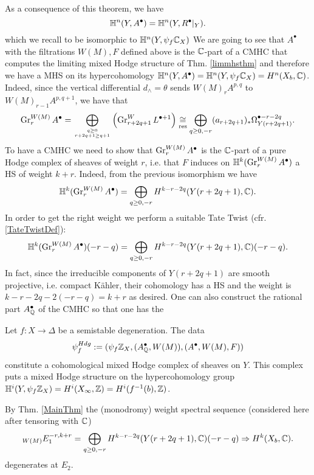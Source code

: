 \documentclass[../main.tex]{subfiles}
\begin{document}
As a consequence of this theorem, we have
\[
\mathbb{H}^n(Y,A^\bullet)= \mathbb{H}^n(Y,R^\bullet|_Y).
\]
which we recall to be isomorphic to $\mathbb{H}^n(Y,\psi_f \mathbb{C}_X)$
We are going to see that $A^\bullet$ with the filtrations $W(M), F$ defined above is the $\mathbb{C}$-part of a CMHC that computes the limiting mixed Hodge structure of Thm. \ref{limmhsthm} and therefore we have a MHS on its hypercohomology $\mathbb{H}^n(Y,A^\bullet)= \mathbb{H}^n(Y,\psi_f \mathbb{C}_X)= H^n(X_b, \mathbb{C})$.
Indeed, since the vertical differential $d_\wedge=\theta$ sends $W(M)_rA^{p,q}$ to $W(M)_{r-1}A^{p,q+1}$, we have that
\[
\operatorname{Gr}^{W(M)}_r A^\bullet = \bigoplus_{q \geq 0 \atop r+2q+1 \geq q+1} \left( \operatorname{Gr}^W_{r+2q+1} L^{\bullet+1} \right) \underset{{\operatorname{res}}} {\cong}   \bigoplus_{q \geq0,-r}(a_{r+2q+1})_* \Omega^{\bullet-r-2q}_{Y(r+2q+1)}.
\]
To have a CMHC we need to show that $\operatorname{Gr}^{W(M)}_r A^\bullet$ is the $\mathbb{C}$-part of a pure Hodge complex of sheaves of weight $r$, i.e. that $F$  induces on  $\mathbb{H}^k(\operatorname{Gr}^{W(M)}_r A^\bullet)$ a HS of weight $k+r$. Indeed, from the previous isomorphism we have
\[
\mathbb{H}^k(\operatorname{Gr}^{W(M)}_r A^\bullet)  = \bigoplus_{q \geq0,-r}H^{k-r-2q}(Y(r+2q+1), \mathbb{C}).
\]
In order to get the right weight we perform a suitable Tate Twist (cfr. \ref{TateTwistDef}):
\[
\mathbb{H}^k(\operatorname{Gr}^{W(M)}_r A^\bullet) (-r-q) = \bigoplus_{q \geq0,-r}H^{k-r-2q}(Y(r+2q+1), \mathbb{C})(-r-q).
\]
In fact, since the irreducible components of $Y(r+2q+1)$ are smooth projective, i.e. compact K\"ahler, their cohomology has a HS and the weight is $k-r-2q -2(-r-q)=k+r$ as desired. 
One can also construct the rational part $A^\bullet_{\mathbb{Q}}$ of the CMHC so that one has the 
\begin{theorem}  \textup{\cite[Thm. 11.22]{PS08}} \label{MHSonpsi}
    Let $f \colon X \to \Delta$ be a semistable degeneration.
    The data
\[
\psi^{Hdg}_f := (\psi_f \mathbb{Z}_X,(A^\bullet_{\mathbb{Q}},W(M)),(A^\bullet,W(M),F))
\]
constitute a cohomological mixed Hodge complex of sheaves on $Y$.
This complex puts a mixed Hodge structure on the hypercohomology group $\mathbb{H}^i(Y,\psi_f \mathbb{Z}_X) = H^i(X_\infty,\mathbb{Z}) = H^i(f^{-1}(b),\mathbb{Z})$.
\end{theorem}
By Thm. \ref{MainThm} the (monodromy) weight spectral sequence (considered here after tensoring with $\mathbb{C}$) 
\begin{align} \label{monweightSpSeq}
 {}_{W(M)}{}{E_1^{-r,k+r}} = \bigoplus_{q \geq 0,-r } H^{k-r-2q}(Y(r+2q+1),\mathbb{C})(-r-q) \Rightarrow H^k(X_b,\mathbb{C}). 
\end{align}
degenerates at $E_2$.
\end{document}
